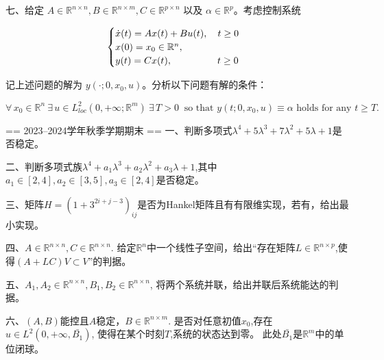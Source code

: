 七、给定 \(A \in \mathbb{R}^{n \times n}, B \in \mathbb{R}^{n \times m}, C \in \mathbb{R}^{p \times n}\) 以及 \(\alpha \in \mathbb{R}^p\)。考虑控制系统

\[\begin{cases}
\dot{x}(t) = Ax(t) + Bu(t), \quad t \geq 0 \\
x(0) = x_0 \in \mathbb{R}^n, \\
y(t) = Cx(t), \hspace{4.72em} t \geq 0
\end{cases}\]

记上述问题的解为 \(y(\cdot; 0, x_0, u)\)。分析以下问题有解的条件：

\[\forall\, x_0 \in \mathbb{R}^n\ \exists\, u \in L^2_{loc}(0, +\infty; \mathbb{R}^m)
\ \exists\, T > 0\ \text{ so that } y(t ; 0, x_0, u) \equiv \alpha \text{ holds for any } t \geq T.\]


== 2023--2024学年秋季学期期末 ==
一、判断多项式$\lambda^4+5\lambda^3+7\lambda^2+5\lambda+1$是否稳定。

二、判断多项式族$\lambda^4+a_1\lambda^3+a_2\lambda^2+a_3\lambda+1$,其中$ a_1\in [2,4],a_2\in [3,5],a_3\in[2,4]$是否稳定。

三、矩阵$H=(1+3^{2i+j-3})_{ij}$是否为Hankel矩阵且有有限维实现，若有，给出最小实现。

四、$A\in \mathbb{R}^{n\times n},C\in \mathbb{R}^{n\times n}$.
给定$\mathbb{R}^n$中一个线性子空间，给出“存在矩阵$L\in \mathbb{R}^{n\times p}$,使得$(A+LC)V\subset V$”的判据。

五、$A_1,A_2\in\mathbb{R}^{n\times n},B_1,B_2\in\mathbb{R}^{n\times n}$,
将两个系统并联，给出并联后系统能达的判据。

六、$(A,B)$能控且$A$稳定，$B\in\mathbb{R}^{n\times m}$.
是否对任意初值$x_0$,存在$u\in L^2(0,+\infty,\bar{B_1})$,
使得在某个时刻$T$,系统的状态达到零。
此处$\bar{B_1}$是$\mathbb{R}^m$中的单位闭球。